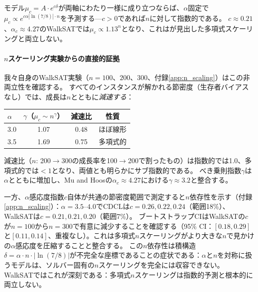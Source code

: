 \documentclass[11pt,a4paper]{article}
\newcommand{\mc}{\mu_c}
\begin{document}
モデル$\mc = A \cdot e^{c\delta}$が両軸にわたり一様に成り立つならば、$\alpha$固定で$\mc \propto e^{c \alpha |\ln(7/8)| \cdot n}$を予測する---$c > 0$であれば$n$に対して指数的である。
$c \approx 0.21$、$\alpha_c \approx 4.27$のWalkSATでは$\mc \propto 1.13^n$となり、これは\cite{MuHoos2015}が見出した多項式スケーリングと両立しない。

\paragraph{$n$スケーリング実験からの直接的証拠}
我々自身のWalkSAT実験（$n = 100$、$200$、$300$、付録\ref{app:n_scaling}）はこの非両立性を確認する。
すべてのインスタンスが解かれる節密度（生存者バイアスなし）では、成長は$n$とともに\emph{減速する}：
\begin{center}
\begin{tabular}{lccc}
\toprule
$\alpha$ & $\gamma$（$\mc \sim n^\gamma$） &
  減速比 & 性質 \\
\midrule
3.0 & 1.07 & 0.48 & ほぼ線形 \\
3.5 & 1.69 & 0.75 & 多項式的 \\
\bottomrule
\end{tabular}
\end{center}
減速比（$n$: 200$\to$300の成長率を100$\to$200で割ったもの）は指数的では1.0、多項式的では$< 1$となり、両値とも明らかにサブ指数的である。
べき乗則指数$\gamma$は$\alpha$とともに増加し、Mu and Hoosの$\alpha_c \approx 4.27$における$\gamma \approx 3.2$と整合する。

一方、$\alpha$感応度指数$c$自体が共通の節密度範囲で測定すると$n$依存性を示す（付録\ref{app:n_scaling}）：$\alpha = 3.5$--$4.0$でCDCLは$c = 0.26, 0.22, 0.24$（範囲18\%）、WalkSATは$c = 0.21, 0.21, 0.20$（範囲7\%）。
ブートストラップCIはWalkSATの$c$が$n = 100$から$n = 300$で有意に減少することを確認する（95\% CI：$[0.18, 0.29]$と$[0.11, 0.14]$、重複なし）。これは多項式$n$スケーリングがより大きな$n$で見かけの$\alpha$感応度を圧縮することと整合する。
この$n$依存性は積構造$\delta = \alpha \cdot n \cdot |\!\ln(7/8)|$が不完全な座標であることの症状である：$\alpha$と$n$を対称に扱うモデルは、ソルバー固有の$n$スケーリングを完全には収容できない。
WalkSATではこれが深刻である：多項式$n$スケーリングは指数的予測と根本的に両立しない。
\end{document}
